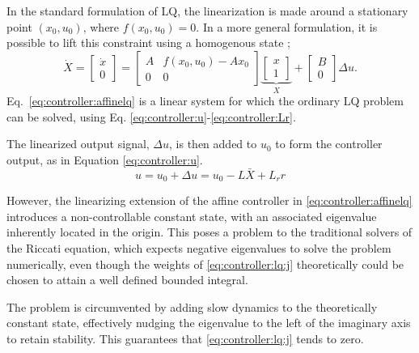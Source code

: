    In the standard formulation of LQ, the linearization is made
    around a stationary point $(x_{0},u_{0})$, where $f(x_{0},u_{0}) = 0$.
    In a more general formulation, it is possible to lift this constraint
    using a homogenous state \citep{Rantzer99piecewiselinear};
    \begin{equation}
    \label{eq:controller:affinelq}
        \dot{X} = \left[
        \begin{array}{c}
            \dot{x} \\
            0
        \end{array}\right] =
        \left[
        \begin{array}{cc}
            A & f(x_{0},u_{0})-Ax_{0} \\
            0 & 0
        \end{array}\right]
        \underbrace{\left[
        \begin{array}{c}
            x \\
            1
        \end{array}\right]}_{X}
        +
        \left[
        \begin{array}{c}
            B \\
            0
        \end{array}\right]
        \Delta u.
    \end{equation}
    Eq.~\ref{eq:controller:affinelq} is a linear system for which
    the ordinary LQ problem can be solved, using Eq.
    \eqref{eq:controller:u}-\eqref{eq:controller:Lr}.

    The linearized output signal, $\Delta u$, is then added
    to $u_{0}$ to form the controller output, as in Equation \eqref{eq:controller:u}.
    \begin{equation}
    \label{eq:controller:u}
        u = u_{0} + \Delta u = u_{0} - L\bar{X} + L_{r}r
    \end{equation}

    However, the linearizing extension of the affine controller in \eqref{eq:controller:affinelq}
    introduces a non-controllable constant state, with
    an associated eigenvalue inherently located in the
    origin.
    This poses a problem to the traditional solvers of the Riccati equation, which
    expects negative eigenvalues to solve the problem numerically, even though
    the weights of \eqref{eq:controller:lq:j} theoretically could be chosen to
    attain a well defined bounded integral.

    The problem is circumvented by adding slow dynamics to the theoretically
    constant state, effectively nudging the eigenvalue to the left of the
    imaginary axis to retain stability.
    This guarantees that \eqref{eq:controller:lq:j} tends to zero.

